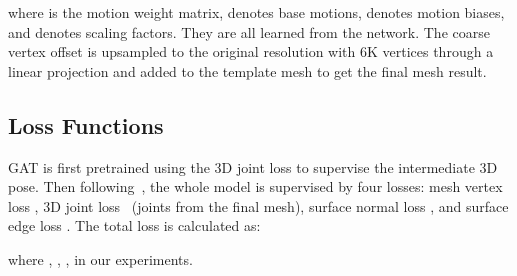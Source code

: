 \documentclass{article}
\def\VspacePa{\vspace{-0.30cm}}
\def\VspacePb{\vspace{-0.20cm}}
\begin{document}
where  is the motion weight matrix,  denotes  base motions,  denotes motion biases, and  denotes scaling factors. They are all learned from the network. The coarse vertex offset  is upsampled to the original resolution with 6K vertices through a linear projection and added to the template mesh to get the final mesh result.




\VspacePa
\subsection{Loss Functions} 
\VspacePb
GAT is first pretrained using the 3D joint loss to supervise the intermediate 3D pose.
Then following~\cite{choi2020pose2mesh, zheng2021lightweight}, the whole model is supervised by four losses: mesh vertex loss , 3D joint loss ~(joints from the final mesh), surface normal loss , and surface edge loss . The total loss is calculated as:
\vspace{-2mm}

where , , ,  in our experiments.
\end{document}
